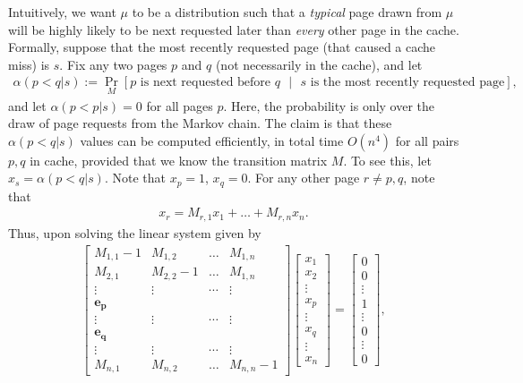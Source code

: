 \documentclass[11pt]{article}
\begin{document}
Intuitively, we want $\mu$ to be a distribution such that a \textit{typical} page drawn from $\mu$ will be highly likely to be next requested later than \textit{every} other page in the cache. Formally, suppose that the most recently requested page (that caused a cache miss) is $s$. Fix any two pages $p$ and $q$ (not necessarily in the cache), and let
\begin{align}
    \label{eqn:alpha-q-p-def}
    \alpha(p<q|s) := \Pr_M[\text{$p$ is next requested before $q$ }|\text{ $s$ is the most recently requested page}],
\end{align}
and let $\alpha(p<p|s)=0$ for all pages $p$. Here, the probability is only over the draw of page requests from the Markov chain.
The claim is that these $\alpha(p<q|s)$ values can be computed efficiently, in total time $O(n^4)$ for all pairs $p,q$ in cache, provided that we know the transition matrix $M$. To see this, let $x_s=\alpha(p<q|s)$. Note that $x_p=1$, $x_q=0$. For any other page $r \neq p,q$, note that
\begin{align*}
    x_r = M_{r,1}x_1 + \dots + M_{r,n}x_n.
\end{align*}
Thus, upon solving the linear system given by
\begin{align}
    \label{eqn:linear-system-for-alpha}
    \begin{bmatrix}
        M_{1,1} - 1 & M_{1,2} & \dots & M_{1,n} \\
        M_{2,1} & M_{2,2} -1 & \dots & M_{1,n} \\
        \vdots & \vdots & \cdots & \vdots\\
        \boldsymbol{e_p} \\
        \vdots & \vdots & \cdots &\vdots \\
        \boldsymbol{e_q} \\
        \vdots & \vdots & \cdots & \vdots \\
        M_{n,1} & M_{n,2} & \dots & M_{n,n}-1
    \end{bmatrix}
    \begin{bmatrix}
        x_1 \\ x_2 \\ \vdots \\ x_p \\ \vdots \\ x_q \\ \vdots \\ x_n
    \end{bmatrix} = 
    \begin{bmatrix}
        0 \\ 0 \\ \vdots \\ 1 \\ \vdots \\ 0 \\ \vdots \\ 0
    \end{bmatrix},
\end{align}
\end{document}
